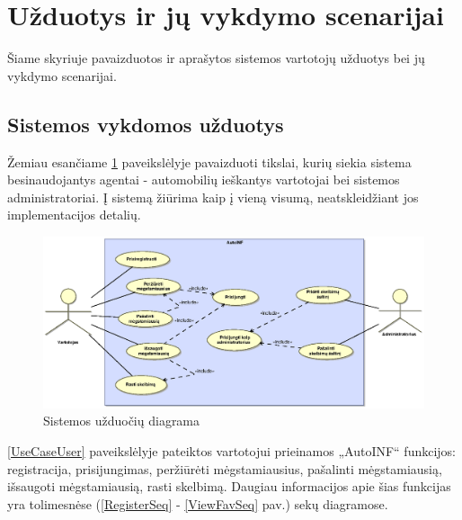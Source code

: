 \documentclass[12pt]{article}
\begin{document}
	
	
	\pagebreak

	\section{Užduotys ir jų vykdymo scenarijai}
	Šiame skyriuje pavaizduotos ir aprašytos sistemos vartotojų užduotys bei jų vykdymo scenarijai.
	\subsection{Sistemos vykdomos užduotys}
	Žemiau esančiame \ref{UseCase} paveikslėlyje pavaizduoti tikslai, kurių siekia sistema besinaudojantys agentai - automobilių ieškantys vartotojai bei sistemos administratoriai. Į sistemą žiūrima kaip į vieną visumą, neatskleidžiant jos implementacijos detalių.
	
	\begin{figure}[h]
		\begin{center}
			\includegraphics[width=\textwidth]{Tikslai.eps}
			\caption{Sistemos užduočių diagrama\label{UseCase}}
		\end{center}
	\end{figure}
	
	\pagebreak

	\ref{UseCaseUser} paveikslėlyje pateiktos vartotojui prieinamos „AutoINF“ funkcijos: registracija, prisijungimas, peržiūrėti mėgstamiausius, pašalinti mėgstamiausią, išsaugoti mėgstamiausią, rasti skelbimą. Daugiau informacijos apie šias funkcijas yra tolimesnėse (\ref{RegisterSeq} - \ref{ViewFavSeq} pav.) sekų diagramose.
	
\end{document}
